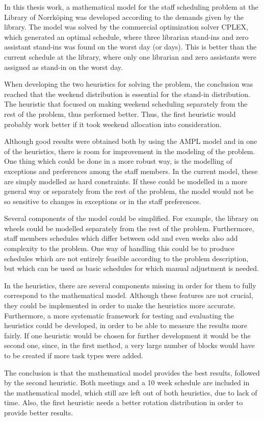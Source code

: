 In this thesis work, a mathematical model for the staff scheduling problem at the Library of Norrköping was developed according to the demands given by the library. The model was solved by the commercial optimization solver CPLEX, which generated an optimal schedule, where three librarian stand-ins and zero assistant stand-ins was found on the worst day (or days). This is better than the current schedule at the library, where only one librarian and zero assistants were assigned as stand-in on the worst day.

When developing the two heuristics for solving the problem, the conclusion was reached that the weekend distribution is essential for the stand-in distribution. The heuristic that focused on making weekend scheduling separately from the rest of the problem, thus performed better. Thus, the first heuristic would probably work better if it took weekend allocation into consideration.

Although good results were obtained both by using the AMPL model and in one of the heuristics, there is room for improvement in the modeling of the problem. One thing which could be done in a more robust way, is the modelling of exceptions and preferences among the staff members. In the current model, these are simply modelled as hard constraints. If these could be modelled in a more general way or separately from the rest of the problem, the model would not be so sensitive to changes in exceptions or in the staff preferences.

Several components of the model could be simplified. For example, the library on wheels could be modelled separately from the rest of the problem. Furthermore, staff members schedules which differ between odd and even weeks also add complexity to the problem. One way of handling this could be to produce schedules which are not entirely feasible according to the problem description, but which can be used as basic schedules for which manual adjustment is needed.

In the heuristics, there are several components missing in order for them to fully correspond to the mathematical model. Although these features are not crucial, they could be implemented in order to make the heuristics more accurate. Furthermore, a more systematic framework for testing and evaluating the heuristics could be developed, in order to be able to measure the results more fairly. If one heuristic would be chosen for further development it would be the second one, since, in the first method, a very large number of blocks would have to be created if more task types were added.

The conclusion is that the mathematical model provides the best results, followed by the second heuristic. Both meetings and a 10 week schedule are included in the mathematical model, which still are left out of both heuristics, due to lack of time. Also, the first heuristic needs a better rotation distribution in order to provide better results.


